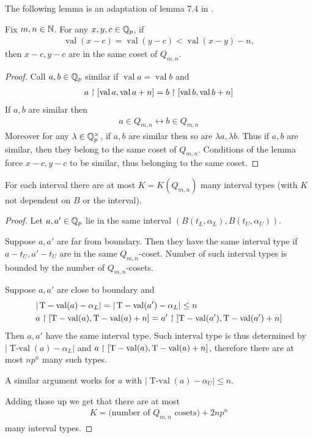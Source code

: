 \documentclass{amsart}
\newcommand{\paren}[1]{\left(#1\right)}
\DeclareMathOperator{\val}{val}
\DeclareMathOperator{\tval}{T-val}
\begin{document}
The following lemma is an adaptation of lemma 7.4 in \cite{density}.
\begin{Lemma} \label{distance}
  Fix $m,n \in \mathbb{N}$.
  For any $x,y,c \in \mathbb{Q}_p$, if
  \begin{align*}
    \val (x - c) = \val (y - c) < \val (x - y) - n,
  \end{align*}
  then $x - c, y - c$ are in the same coset of $Q_{m,n}$.
\end{Lemma}
\begin{proof}
  Call $a,b \in \mathbb{Q}_p$ similar if $\val a = \val b$ and
  \begin{align*}
    a \midr [\val a, \val a + n] = b \midr [\val b, \val b + n]
  \end{align*}
  If $a,b$ are similar then
  \begin{align*}
    a \in Q_{m,n} \leftrightarrow b \in Q_{m,n}
  \end{align*}
  Moreover for any $\lambda \in \mathbb{Q}_p^\times$, if $a,b$ are similar then so are $\lambda a, \lambda b$.
  Thus if $a,b$ are similar, then they belong to the same coset of $Q_{m,n}$.
  Conditions of the lemma force $x - c, y - c$ to be similar, thus belonging to the same coset.
\end{proof} 


\begin{Lemma} \label{interval_type_count}
  For each interval there are at most $K = K(Q_{m,n})$ many interval types 
  (with $K$ not dependent on $B$ or the interval).  
\end{Lemma}

\begin{proof}
  Let $a, a' \in \mathbb{Q}_p$ lie in the same interval $\paren{B(t_L, \alpha_L),  B(t_U, \alpha_U)}$.

  Suppose $a, a'$ are far from boundary.
  Then they have the same interval type if $a - t_U, a' - t_U$ are in the same $Q_{m,n}$-coset.
  Number of such interval types is bounded by the number of $Q_{m,n}$-cosets.

  Suppose $a, a'$ are close to boundary and
  \begin{align*}
    &|\tval(a) - \alpha_L| = |\tval(a') - \alpha_L| \leq n \\
    &a \midr [\tval(a), \tval(a) + n] = a' \midr [\tval(a'), \tval(a') + n]  
  \end{align*}
  Then $a, a'$ have the same interval type.
  Such interval type is thus determined by $|\tval(a) - \alpha_L|$ and $a \midr [\tval(a), \tval(a) + n]$,
  therefore there are at most $n p^n$ many such types.

  A similar argument works for $a$ with $|\tval(a) - \alpha_U| \leq n$.

  Adding those up we get that there are at most
  \begin{align*}
    K = \text{(number of $Q_{m,n}$ cosets)} + 2 n p^n  
  \end{align*}
  many interval types.
\end{proof}
\end{document}
